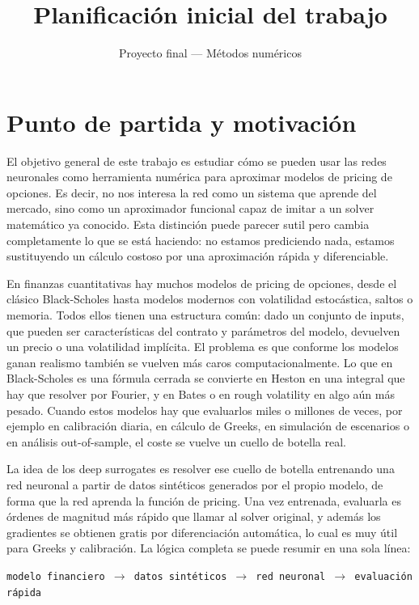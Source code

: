 \documentclass[11pt,a4paper]{article}
\title{Planificación inicial del trabajo}
\author{Proyecto final --- Métodos numéricos}
\date{}
\begin{document}
\maketitle

\section*{Punto de partida y motivación}

El objetivo general de este trabajo es estudiar cómo se pueden usar las redes neuronales como herramienta numérica para aproximar modelos de pricing de opciones. Es decir, no nos interesa la red como un sistema que aprende del mercado, sino como un aproximador funcional capaz de imitar a un solver matemático ya conocido. Esta distinción puede parecer sutil pero cambia completamente lo que se está haciendo: no estamos prediciendo nada, estamos sustituyendo un cálculo costoso por una aproximación rápida y diferenciable.

En finanzas cuantitativas hay muchos modelos de pricing de opciones, desde el clásico Black-Scholes hasta modelos modernos con volatilidad estocástica, saltos o memoria. Todos ellos tienen una estructura común: dado un conjunto de inputs, que pueden ser características del contrato y parámetros del modelo, devuelven un precio o una volatilidad implícita. El problema es que conforme los modelos ganan realismo también se vuelven más caros computacionalmente. Lo que en Black-Scholes es una fórmula cerrada se convierte en Heston en una integral que hay que resolver por Fourier, y en Bates o en rough volatility en algo aún más pesado. Cuando estos modelos hay que evaluarlos miles o millones de veces, por ejemplo en calibración diaria, en cálculo de Greeks, en simulación de escenarios o en análisis out-of-sample, el coste se vuelve un cuello de botella real.

La idea de los deep surrogates es resolver ese cuello de botella entrenando una red neuronal a partir de datos sintéticos generados por el propio modelo, de forma que la red aprenda la función de pricing. Una vez entrenada, evaluarla es órdenes de magnitud más rápido que llamar al solver original, y además los gradientes se obtienen gratis por diferenciación automática, lo cual es muy útil para Greeks y calibración. La lógica completa se puede resumir en una sola línea:

\begin{center}
\texttt{modelo financiero $\rightarrow$ datos sintéticos $\rightarrow$ red neuronal $\rightarrow$ evaluación rápida}
\end{center}
\end{document}
